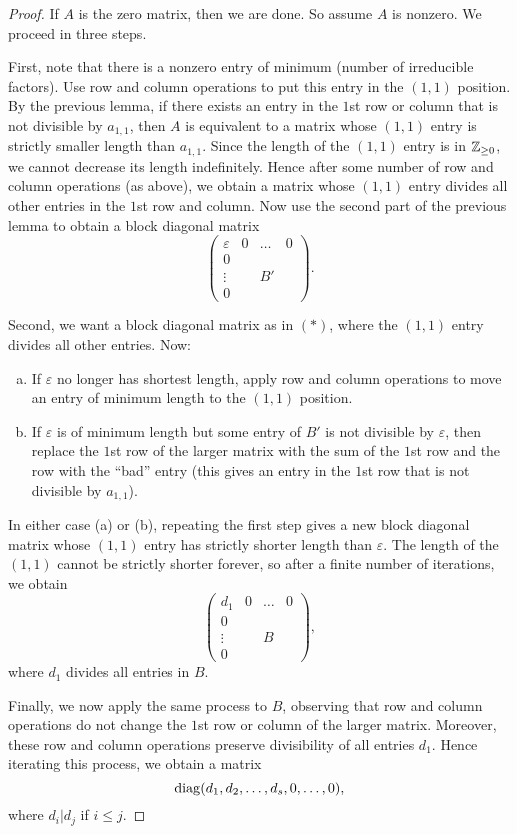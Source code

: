 \begin{proof}
  If $A$ is the zero matrix, then we are done. So assume
  $A$ is nonzero. We proceed in three steps.

  First, note that there is a nonzero entry of
  minimum (number of irreducible factors). Use row and
  column operations to put this entry in the
  $(1, 1)$ position. By the previous lemma, if there
  exists an entry in the $1$st row or column that is not
  divisible by $a_{1, 1}$, then $A$ is equivalent to a
  matrix whose $(1, 1)$ entry is strictly smaller length
  than $a_{1, 1}$. Since the length of the $(1, 1)$ entry
  is in $\mathbb{Z}_{\ge 0}$, we cannot decrease its length
  indefinitely. Hence after some number of row and
  column operations (as above), we obtain a matrix whose
  $(1, 1)$ entry divides all other entries in the
  $1$st row and column. Now use the second part of the
  previous lemma to obtain a block diagonal matrix
  \[
    \begin{pmatrix}
      \varepsilon & 0 & \dots & 0 \\
      0 &  \\
      \vdots & & B' \\
      0 & 
    \end{pmatrix}. \tag{$*$}
  \]

  Second, we want a block diagonal matrix as in $(*)$,
  where the $(1, 1)$ entry divides all other entries.
  Now:
  \begin{enumerate}[(a)]
    \item If $\varepsilon$ no longer has shortest length,
      apply row and column operations to move an
      entry of minimum length to the $(1, 1)$ position.
    \item If $\varepsilon$ is of minimum length but
      some entry of $B'$ is not divisible by $\varepsilon$,
      then replace the $1$st row of the larger matrix
      with the sum of the $1$st row and the row with the
      ``bad'' entry (this gives an entry in the $1$st
      row that is not divisible by $a_{1, 1}$).
  \end{enumerate}
  In either case (a) or (b), repeating the first step
  gives a new block diagonal matrix whose $(1, 1)$ entry
  has strictly shorter length than $\varepsilon$. The
  length of the $(1, 1)$ cannot be strictly shorter
  forever, so after a finite number of iterations, we
  obtain
  \[
    \begin{pmatrix}
      d_1 & 0 & \dots & 0 \\
      0 &  \\
      \vdots & & B \\
      0 &
    \end{pmatrix},
  \]
  where $d_1$ divides all entries in $B$.

  Finally, we now apply the same process to $B$, observing
  that row and column operations do not change the
  $1$st row or column of the larger matrix. Moreover,
  these row and column operations preserve divisibility
  of all entries $d_1$. Hence iterating this process,
  we obtain a matrix
  \[
    \operatorname{diag}(d_1, d_2, \dots, d_s, 0, \dots, 0),
  \]
  where $d_i | d_j$ if $i \le j$.
\end{proof}


